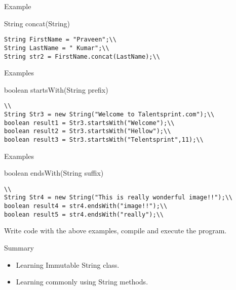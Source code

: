 \documentclass[aspectratio=169,14pt,usenames,dvipsnames]{beamer}
\begin{document}
\begin{frame}{Example}
\begin{block}{String concat(String)}
\begin{lstlisting}
String FirstName = "Praveen";\\
String LastName = " Kumar";\\
String str2 = FirstName.concat(LastName);\\
\end{lstlisting}
\end{block}
\end{frame}

\begin{frame}{Examples}
\begin{block}{boolean startsWith(String prefix)}\\
\begin{lstlisting}\\
String Str3 = new String("Welcome to Talentsprint.com");\\
boolean result1 = Str3.startsWith("Welcome");\\
boolean result2 = Str3.startsWith("Hellow");\\
boolean result3 = Str3.startsWith("Telentsprint",11);\\
\end{lstlisting}
\end{block}

\end{frame}
\begin{frame}{Examples}
\begin{block}{boolean endsWith(String suffix)}\\
\begin{lstlisting}\\
String Str4 = new String("This is really wonderful image!!");\\
boolean result4 = str4.endsWith("image!!");\\
boolean result5 = str4.endsWith("really");\\
\end{lstlisting}
\end{block}
\vspace{0.5em}
\color{red} Write code with the above examples, compile and execute
the program.
\end{frame}


\begin{frame}{Summary}
\begin{itemize}
    \item Learning Immutable String class.
\item Learning commonly using String methods.
\end{itemize}
\end{frame}
\end{document}
